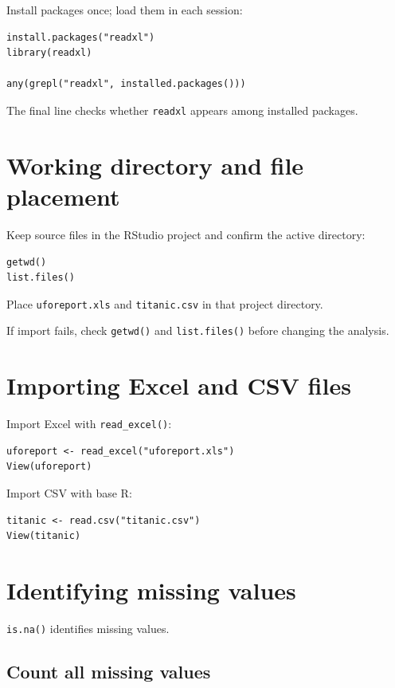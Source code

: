 Install packages once; load them in each session:

\begin{lstlisting}[style=dsr]
install.packages("readxl")
library(readxl)

any(grepl("readxl", installed.packages()))
\end{lstlisting}

The final line checks whether \texttt{readxl} appears among installed packages.

\section{Working directory and file placement}

Keep source files in the RStudio project and confirm the active directory:

\begin{lstlisting}[style=dsr]
getwd()
list.files()
\end{lstlisting}

Place \texttt{uforeport.xls} and \texttt{titanic.csv} in that project directory.

\begin{keyidea}
If import fails, check \texttt{getwd()} and \texttt{list.files()} before changing the analysis.
\end{keyidea}

\section{Importing Excel and CSV files}

Import Excel with \texttt{read\_excel()}:

\begin{lstlisting}[style=dsr]
uforeport <- read_excel("uforeport.xls")
View(uforeport)
\end{lstlisting}

Import CSV with base R:

\begin{lstlisting}[style=dsr]
titanic <- read.csv("titanic.csv")
View(titanic)
\end{lstlisting}

\section{Identifying missing values}

\texttt{is.na()} identifies missing values.

\subsection{Count all missing values}

